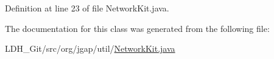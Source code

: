 Definition at line 23 of file Network\-Kit.\-java.



The documentation for this class was generated from the following file\-:\begin{DoxyCompactItemize}
\item 
L\-D\-H\-\_\-\-Git/src/org/jgap/util/\hyperlink{_network_kit_8java}{Network\-Kit.\-java}\end{DoxyCompactItemize}
